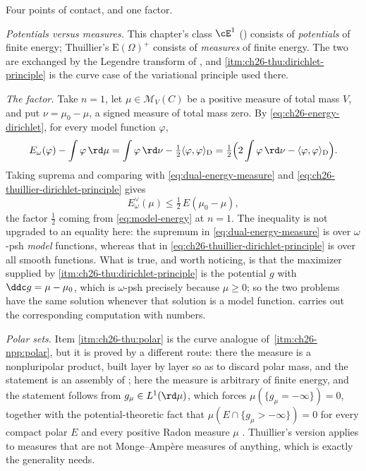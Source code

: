 \begin{remark}
\label{rem:ch26-thuillier-comparison}
Four points of contact, and one factor.

\emph{Potentials versus measures.}  This chapter's class \(\cE^1\)
() consists of \emph{potentials} of finite energy; Thuillier's
\(\mathrm E(\Omega)^+\) consists of \emph{measures} of finite energy.  The
two are exchanged by the Legendre transform of
, and
\cref{itm:ch26-thu:dirichlet-principle} is the curve case of the variational
principle used there.

\emph{The factor.}  Take \(n=1\), let \(\mu\in\mathcal M_V(C)\) be a positive
measure of total mass \(V\), and put \(\nu=\mu_0-\mu\), a signed measure of
total mass zero.  By
\eqref{eq:ch26-energy-dirichlet}, for every model function \(\varphi\),
\[
 E_\omega(\varphi)-\int\varphi\,\rd\mu
 =\int\varphi\,\rd\nu-\tfrac12\langle\varphi,\varphi\rangle_{\mathrm D}
 =\tfrac12\Bigl(2\int\varphi\,\rd\nu
        -\langle\varphi,\varphi\rangle_{\mathrm D}\Bigr).
\]
Taking suprema and comparing with \eqref{eq:dual-energy-measure} and
\eqref{eq:ch26-thuillier-dirichlet-principle} gives
\begin{equation}
\label{eq:ch26-dual-vs-thuillier}
 E^\vee_\omega(\mu)\leq\tfrac12\,E(\mu_0-\mu),
\end{equation}
the factor \(\tfrac12\) coming from \eqref{eq:model-energy} at \(n=1\).  The
inequality is not upgraded to an equality here: the supremum in
\eqref{eq:dual-energy-measure} is over \(\omega\)-psh \emph{model} functions,
whereas that in \eqref{eq:ch26-thuillier-dirichlet-principle} is over all
smooth functions.  What is true, and worth noticing, is that the maximizer
supplied by \cref{itm:ch26-thu:dirichlet-principle} is the potential \(g\)
with \(\ddc g=\mu-\mu_0\), which is \(\omega\)-psh precisely because
\(\mu\geq0\); so the two problems have the same solution whenever that
solution is a model function.   carries out the
corresponding computation with numbers.

\emph{Polar sets.}  Item \cref{itm:ch26-thu:polar} is the curve analogue of
\,\cref{itm:ch26-npp:polar}, but it is proved by a
different route: there the measure is a nonpluripolar product, built layer
by layer so as to discard polar mass, and the statement is an assembly of
; here the measure is arbitrary of finite
energy, and the statement follows from \(g_\mu\in L^1(\rd\mu)\), which forces
\(\mu(\{g_\mu=-\infty\})=0\), together with the potential-theoretic fact that
\(\mu(E\cap\{g_\mu>-\infty\})=0\) for every compact polar \(E\) and every
positive Radon measure \(\mu\) \cite[Th\'eor\`eme~3.4.22]{Thu05}.
Thuillier's version applies
to measures that are not Monge--Amp\`ere measures of anything, which is
exactly the generality  needs.


\end{remark}
